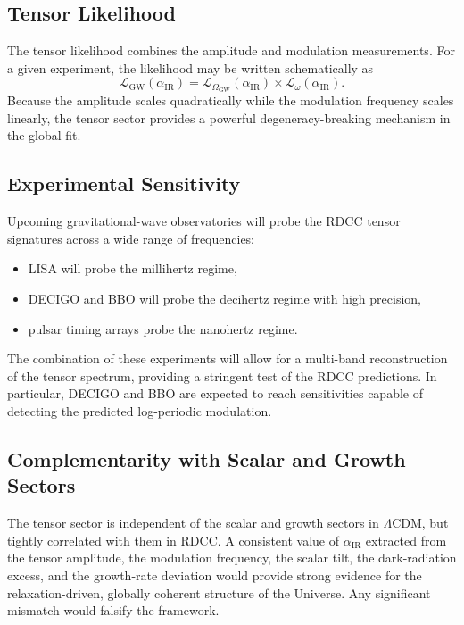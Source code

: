 \documentclass[11pt,a4paper]{article}
\begin{document}
\subsection{Tensor Likelihood}

The tensor likelihood combines the amplitude and modulation measurements. For a given
experiment, the likelihood may be written schematically as
\begin{equation}
    \mathcal{L}_{\mathrm{GW}}(\alpha_{\mathrm{IR}})
    = \mathcal{L}_{\Omega_{\mathrm{GW}}}(\alpha_{\mathrm{IR}})
      \times
      \mathcal{L}_{\omega}(\alpha_{\mathrm{IR}}).
\end{equation}
Because the amplitude scales quadratically while the modulation frequency scales linearly, the
tensor sector provides a powerful degeneracy-breaking mechanism in the global fit.

\subsection{Experimental Sensitivity}

Upcoming gravitational-wave observatories will probe the RDCC tensor signatures across a wide
range of frequencies:
\begin{itemize}
    \item LISA will probe the millihertz regime,
    \item DECIGO and BBO will probe the decihertz regime with high precision,
    \item pulsar timing arrays probe the nanohertz regime.
\end{itemize}

The combination of these experiments will allow for a multi-band reconstruction of the tensor
spectrum, providing a stringent test of the RDCC predictions. In particular, DECIGO and BBO
are expected to reach sensitivities capable of detecting the predicted log-periodic modulation.

\subsection{Complementarity with Scalar and Growth Sectors}

The tensor sector is independent of the scalar and growth sectors in $\Lambda$CDM, but tightly
correlated with them in RDCC. A consistent value of $\alpha_{\mathrm{IR}}$ extracted from the tensor
amplitude, the modulation frequency, the scalar tilt, the dark-radiation excess, and the growth-rate
deviation would provide strong evidence for the relaxation-driven, globally coherent structure of
the Universe. Any significant mismatch would falsify the framework.
\end{document}
